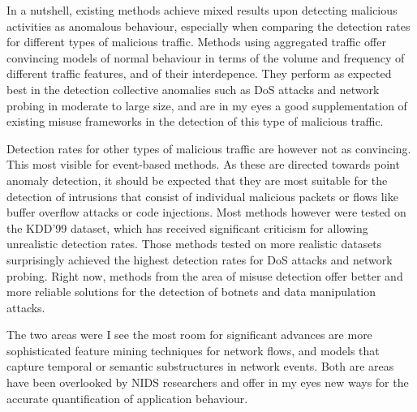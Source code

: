 \documentclass[a4paper,12pt,twoside]{report}
\begin{document}
In a nutshell, existing methods achieve mixed results upon detecting malicious activities as anomalous behaviour, especially when comparing the detection rates for different types of malicious traffic. Methods using aggregated traffic offer convincing models of normal behaviour in terms of the volume and frequency of different traffic features, and of their interdepence. They perform as expected best in the detection collective anomalies such as DoS attacks and network probing in moderate to large size, and are in my eyes a good supplementation of existing misuse frameworks in the detection of this type of malicious traffic.  

Detection rates for other types of malicious traffic are however not as convincing. This most visible for event-based methods. As these are directed towards point anomaly detection, it should be expected that they are most suitable for the detection of intrusions that consist of individual malicious packets or flows like buffer overflow attacks or code injections. Most methods however were tested on the KDD'99 dataset, which has received significant criticism for allowing unrealistic detection rates. Those methods tested on more realistic datasets surprisingly achieved the highest detection rates for DoS attacks and network probing.  Right now, methods from the area of misuse detection offer better and more reliable solutions for the detection of botnets and data manipulation attacks.

The two areas were I see the most room for significant advances are more sophisticated feature mining techniques for network flows, and models that capture temporal or semantic substructures in network events. Both are areas have been overlooked by NIDS researchers and offer in my eyes new ways for the accurate quantification of application behaviour.











\appendix



\end{document}
